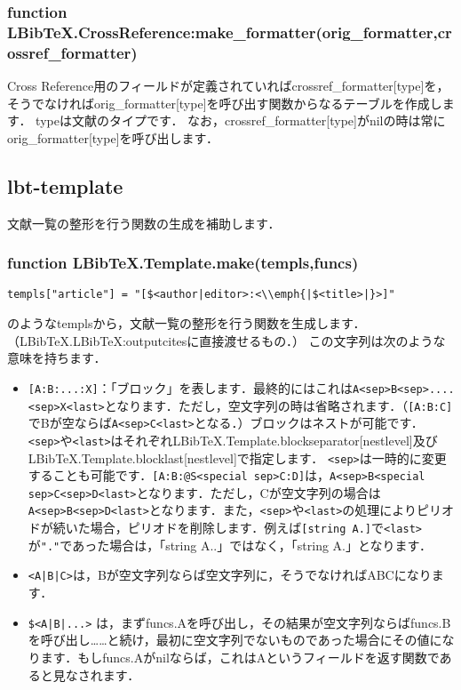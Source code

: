 \documentclass[dvipdfmx,a4paper]{jsarticle}
\begin{document}
\subsubsection{function LBibTeX.CrossReference:make\_formatter(orig\_formatter,crossref\_formatter)}
Cross Reference用のフィールドが定義されていればcrossref\_formatter[type]を，そうでなければorig\_formatter[type]を呼び出す関数からなるテーブルを作成します．
typeは文献のタイプです．
なお，crossref\_formatter[type]がnilの時は常にorig\_formatter[type]を呼び出します．

\subsection{lbt-template}
文献一覧の整形を行う関数の生成を補助します．

\subsubsection{function LBibTeX.Template.make(templs,funcs)}
\begin{lstlisting}
templs["article"] = "[$<author|editor>:<\\emph{|$<title>|}>]"
\end{lstlisting}
のようなtemplsから，文献一覧の整形を行う関数を生成します．（LBibTeX.LBibTeX:outputcitesに直接渡せるもの．）
この文字列は次のような意味を持ちます．
\begin{itemize}
\item \verb|[A:B:...:X]|：「ブロック」を表します．最終的にはこれは\verb|A<sep>B<sep>....<sep>X<last>|となります．ただし，空文字列の時は省略されます．（\verb|[A:B:C]|でBが空ならば\verb|A<sep>C<last>|となる．）ブロックはネストが可能です．\verb|<sep>|や\verb|<last>|はそれぞれLBibTeX.Template.blockseparator[nestlevel]及びLBibTeX.Template.blocklast[nestlevel]で指定します．
\verb|<sep>|は一時的に変更することも可能です．\verb|[A:B:@S<special sep>C:D]|は，\verb|A<sep>B<special sep>C<sep>D<last>|となります．ただし，Cが空文字列の場合は\verb|A<sep>B<sep>D<last>|となります．また，\verb|<sep>|や\verb|<last>|の処理によりピリオドが続いた場合，ピリオドを削除します．例えば\verb|[string A.]|で\verb|<last>|が\verb|"."|であった場合は，「string A..」ではなく，「string A.」となります．
\item \verb:<A|B|C>:は，Bが空文字列ならば空文字列に，そうでなければABCになります．
\item \verb:$<A|B|...>:
は，まずfuncs.Aを呼び出し，その結果が空文字列ならばfuncs.Bを呼び出し……と続け，最初に空文字列でないものであった場合にその値になります．もしfuncs.Aがnilならば，これはAというフィールドを返す関数であると見なされます．
\end{itemize}
\end{document}
